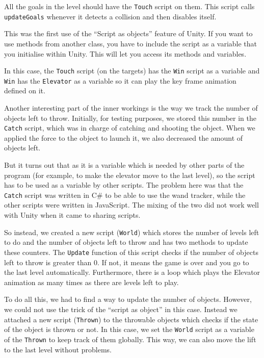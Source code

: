 \documentclass[a4paper]{article}
\begin{document}
All the goals in the level should have the \verb!Touch! script on them. This script calls
\verb!updateGoals! whenever it detects a collision and then disables itself.

This was the first use of the ``Script as objects'' feature of Unity. If you want
to use methods from another class, you have to include the script as a variable
that you initialise within Unity. This will let you access its methods and variables.

In this case, the \verb!Touch! script (on the targets) has the \verb!Win! script as a
variable and \verb!Win! has the \verb!Elevator! as a variable so it can play the key
frame animation defined on it.

Another interesting part of the inner workings is the way we track the number of
objects left to throw. Initially, for testing purposes, we stored this number in the
\verb!Catch! script, which was in charge of catching and shooting the object. When
we applied the force to the object to launch it, we also decreased the amount of
objects left.

But it turns out that as it is a variable which is needed by other parts of the
program (for example, to make the elevator move to the last level), so the script
has to be used as a variable by other scripts. The problem here was that the
\verb!Catch! script was written in C\# to be able to use the wand tracker, while
the other scripts were written in JavaScript. The mixing of the two did not work
well with Unity when it came to sharing scripts.

So instead, we created a new script (\verb!World!) which stores the number of levels
left to do and the number of objects left to throw and has two methods to update
these counters. The \verb!Update! function of this script checks if the number of
objects left to throw is greater than 0. If not, it means the game is over and you
go to the last level automatically. Furthermore, there is a loop which plays the
Elevator animation as many times as there are levels left to play.

To do all this, we had to find a way to update the number of objects.
However, we could not use the trick of the ``script as object'' in this case.
Instead we attached a new script (\verb!Thrown!) to the throwable objects which
checks if the state of the object is thrown or not. In this case, we set the
\verb!World! script as a variable of the \verb!Thrown! to keep track of them
globally. This way, we can also move the lift to the last level without problems.
\end{document}
